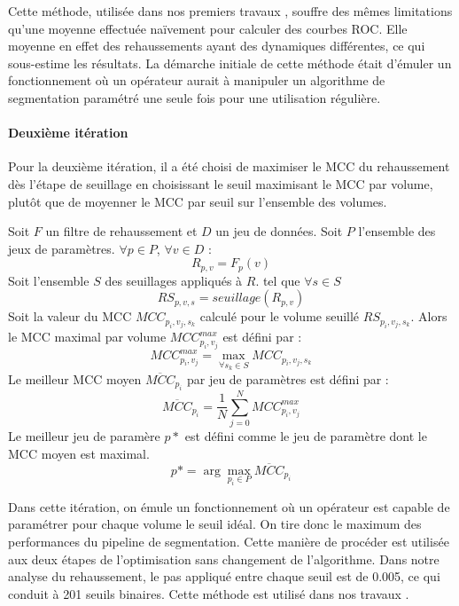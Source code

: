   Cette méthode, utilisée dans nos premiers travaux \cite{Lamy2020_VPH_bench}\cite{Lamy2021_RRPR}\cite{Lamy2020_ICPR}\cite{Lamy2021_ORASIS}, souffre des mêmes limitations qu'une moyenne effectuée naïvement pour calculer des courbes ROC. Elle moyenne en effet des rehaussements ayant des dynamiques différentes, ce qui sous-estime les résultats. La démarche initiale de cette méthode était d'émuler un fonctionnement où un opérateur aurait à manipuler un algorithme de segmentation paramétré une seule fois pour une utilisation régulière.
  
  \paragraph{Deuxième itération}
  Pour la deuxième itération, il a été choisi de maximiser le MCC du rehaussement dès l'étape de seuillage en choisissant le seuil maximisant le MCC par volume, plutôt que de moyenner le MCC par seuil sur l'ensemble des volumes. 

  Soit $F$ un filtre de rehaussement et $D$ un jeu de données. Soit $P$ l'ensemble des jeux de paramètres. 
  $\forall p \in P$, $\forall v \in D$ :
  \begin{equation}
    R_{p,v} = F_{p}(v)
  \end{equation}
  Soit l'ensemble $S$ des seuillages appliqués à $R$. tel que $\forall s \in S$ 
  \begin{equation}
    RS_{p,v,s} = seuillage(R_{p,v}) 
  \end{equation}
  Soit la valeur du MCC $MCC_{p_i,v_j,s_k}$ calculé pour le volume seuillé $RS_{p_i,v_j,s_k}$.
  Alors le MCC maximal par volume $MCC_{p_i,v_j}^{max}$ est défini par :
  \begin{equation}
    MCC_{p_i,v_j}^{max} = \max_{\forall s_k \in S} MCC_{p_i,v_j,s_k}
  \end{equation}
  Le meilleur MCC moyen $\overline{MCC}_{p_i}$ par jeu de paramètres est défini par : 
  \begin{equation}
    \overline{MCC}_{p_i} = \frac{1}{N} \sum_{j=0}^{N} MCC_{p_i,v_j}^{max}
  \end{equation}
  Le meilleur jeu de paramère $p*$ est défini comme le jeu de paramètre dont le MCC moyen est maximal.
  \begin{equation}
    p* = \arg\max_{p_i \in P} \overline{MCC}_{p_i}
  \end{equation}

  Dans cette itération, on émule un fonctionnement où un opérateur est capable de paramétrer pour chaque volume le seuil idéal. On tire donc le maximum des performances du pipeline de segmentation. Cette manière de procéder est utilisée aux deux étapes de l'optimisation sans changement de l'algorithme. Dans notre analyse du rehaussement, le pas appliqué entre chaque seuil est de 0.005, ce qui conduit à 201 seuils binaires. Cette méthode est utilisé dans nos travaux \cite{Lamy2022_TMI}.


